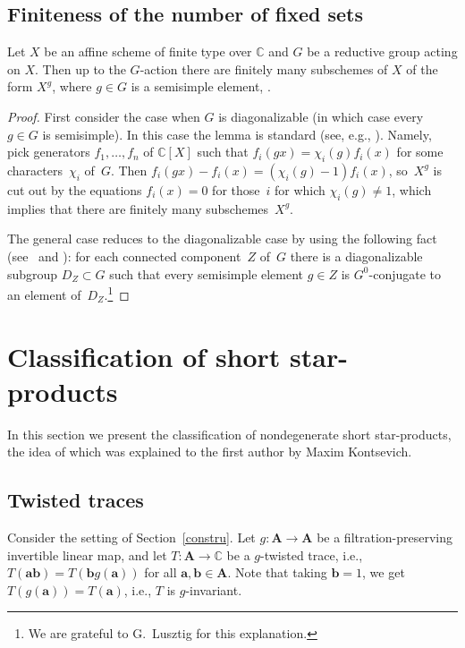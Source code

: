 \subsection{Finiteness of the number of fixed sets}

\begin{Lemma}\label{finfix} Let $X$ be an affine scheme of finite type over ${\mathbb C}$ and
$G$ be a reductive group acting on $X$. Then up to the $G$-action there are finitely many subschemes
of $X$ of the form $X^g$, where $g\in G$ is a semisimple element, .
\end{Lemma}

\begin{proof} First consider the case when $G$ is diagonalizable (in which case every $g\in G$ is semisimple). In this case the lemma is standard (see, e.g., \cite[Proposition on p.~44]{Ste}). Namely, pick generators $f_1,\dots,f_n$ of ${\mathbb C}[X]$ such that $f_i(gx)=\chi_i(g)f_i(x)$ for some characters~$\chi_i$ of~$G$. Then $f_i(gx)-f_i(x)=(\chi_i(g)-1)f_i(x)$, so~$X^g$ is cut out by the equations $f_i(x)=0$ for those~$i$ for which $\chi_i(g)\ne 1$, which implies that there are finitely many subschemes~$X^g$.

The general case reduces to the diagonalizable case by using the following fact (see~\cite{Sie} and \cite[Section~1.14]{Lu}): for each connected component~$Z$ of~$G$ there is a diagonalizable subgroup $D_Z\subset G$ such that every semisimple element $g\in Z$ is $G^0$-conjugate to an element of~$D_Z$.\footnote{We are grateful to G.~Lusztig for this explanation.}
\end{proof}

\section{Classification of short star-products}\label{section3}

In this section we present the classification of nondegenerate short star-products, the idea of which was explained to the first author by Maxim Kontsevich.

\subsection{Twisted traces}

Consider the setting of Section~\ref{constru}. Let $g\colon {{\mathbf A}}\to {{\mathbf A}}$ be a filtration-preserving invertible linear map, and let $T\colon {{\mathbf A}}\to {\mathbb C}$ be a $g$-twisted trace, i.e., $T({\mathbf a}{\mathbf b})=T({\mathbf b}g({\mathbf a}))$ for all ${\mathbf a},{\mathbf b}\in {{\mathbf A}}$. Note that taking ${\mathbf b}=1$, we get $T(g({\mathbf a}))=T({\mathbf a})$, i.e., $T$ is $g$-invariant.

